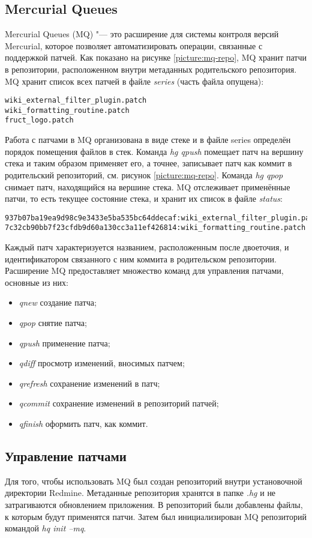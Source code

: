 \subsection{Mercurial Queues}
Mercurial Queues (MQ) \cite{mq} "--- это расширение для системы контроля версий
Mercurial, которое позволяет автоматизировать операции, связанные с поддержкой
патчей. Как показано на рисунке \ref{picture:mq-repo}, MQ хранит патчи в
репозитории, расположенном внутри метаданных родительского репозитория. MQ
хранит список всех патчей в файле \textit{series} (часть файла опущена):
\small{\begin{lstlisting}
wiki_external_filter_plugin.patch
wiki_formatting_routine.patch
fruct_logo.patch
\end{lstlisting}}
Работа с патчами в MQ организована в виде стеке и в файле series определён
порядок помещения файлов в стек. Команда \textit{hg qpush} помещает патч на
вершину стека и таким образом применяет его, а точнее, записывает патч как
коммит в родительский репозиторий, см. рисунок \ref{picture:mq-repo}. Команда
\textit{hg qpop} снимает патч, находящийся на вершине стека. MQ отслеживает
применённые патчи, то есть текущее состояние стека, и хранит их список в файле
\textit{status}:
\small{\begin{lstlisting}
937b07ba19ea9d98c9e3433e5ba535bc64ddecaf:wiki_external_filter_plugin.patch
7c32cb90bb7f23cfdb9d60a130cc3a11ef426814:wiki_formatting_routine.patch
\end{lstlisting}}
Каждый патч характеризуется названием, расположенным после двоеточия, и
идентификатором связанного с ним коммита в родительском репозитории.
Расширение MQ предоставляет множество команд для управления патчами, основные
из них:
\begin{itemize}
  \item \textit{qnew} создание патча;
  \item \textit{qpop} снятие патча;
  \item \textit{qpush} применение патча;
  \item \textit{qdiff} просмотр изменений, вносимых патчем;
  \item \textit{qrefresh} сохранение изменений в патч;
  \item \textit{qcommit} сохранение изменений в репозиторий патчей;
  \item \textit{qfinish} оформить патч, как коммит.
\end{itemize}

\subsection{Управление патчами}
Для того, чтобы использовать MQ был создан репозиторий внутри
установочной директории Redmine. Метаданные репозитория хранятся в папке
\textit{.hg} и не затрагиваются обновлением приложения. В репозиторий
были добавлены файлы, к которым будут применятся патчи. Затем был
инициализирован MQ репозиторий командой \textit{hq init --mq}.

